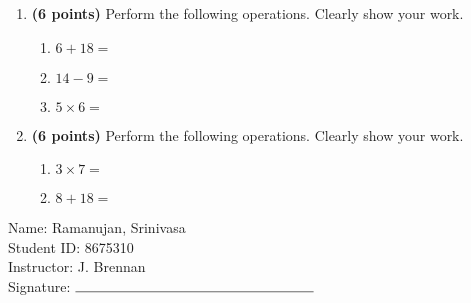 \documentclass[12pt]{amsart}
\begin{document}
\newpage
\begin{enumerate}
\item {\bf (6 points)} 
 Perform the following operations. Clearly show your work. \begin{enumerate}


\def \a{6}\def \b{18}\def \apb{24}

 
\item $\a + \b = $

\vspace{2cm}
\def \a{14}\def \dif{5}\def \b{9}

 
\item $\a - \b = $

\vspace{2cm}
\def \a{5}\def \b{6}\def \ab{11}

 
\item $\a \times \b = $ 

\vspace{2cm}
\def \vshift{1}\def \hshift{2}\def \chang{-2}\def \findval{0}\def \yval{5}

 
\end{enumerate}


\newpage
\item {\bf (6 points)} 
 Perform the following operations. Clearly show your work. \begin{enumerate}


\def \a{3}\def \b{7}\def \ab{10}

 
\item $\a \times \b = $ 

\vspace{2cm}
\def \a{8}\def \b{18}\def \apb{26}

 
\item $\a + \b = $

\vspace{2cm}
\def \vshift{-1}\def \hshift{4}\def \chang{1}\def \findval{5}\def \yval{-3}

 
\end{enumerate}


\newpage\end{enumerate}\graphicspath{{C:/Users/iainc/anaconda3/Randomizer/Sample Course/Sample Assessment 2/}}\setcounter{page}{1}


\thispagestyle{fancy}

 \noindent Name: Ramanujan, Srinivasa \vspace{.3cm} \\\noindent Student ID: 8675310 \vspace{.3cm} \\\noindent Instructor: J. Brennan \vspace{.3cm} \\\noindent Signature: $\rule{6cm}{0.15mm}$ \vspace{.3cm} \\ 
\end{document}
